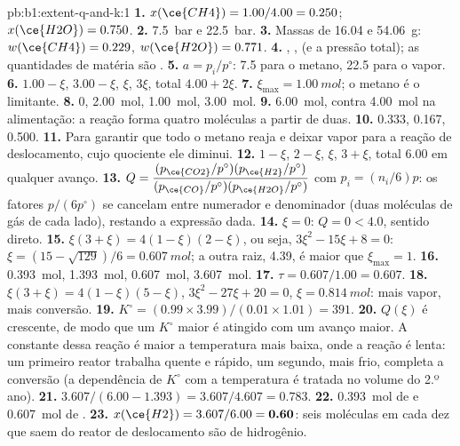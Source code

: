 \begin{solution}{pb:b1:extent-q-and-k:1}
\textbf{1.} $x(\ce{CH4}) = 1.00/4.00 = 0.250$; $x(\ce{H2O}) = 0.750$.
\textbf{2.} \qty{7.5}{bar} e \qty{22.5}{bar}.
\textbf{3.} Massas de 16.04 e \qty{54.06}{g}: $w(\ce{CH4}) = 0.229$,
$w(\ce{H2O}) = 0.771$.
\textbf{4.} , ,  (e a
pressão total); as quantidades de matéria são .
\textbf{5.} $a = p_i/p^\circ$: 7.5 para o metano, 22.5 para o vapor.
\textbf{6.}  $1.00 - \xi$,  $3.00 - \xi$,  $\xi$,
 $3\xi$, total $4.00 + 2\xi$.
\textbf{7.} $\xi_{\max} = \qty{1.00}{mol}$; o metano é o limitante.
\textbf{8.}  0,  \qty{2.00}{mol},  \qty{1.00}{mol},
 \qty{3.00}{mol}.
\textbf{9.} \qty{6.00}{mol}, contra \qty{4.00}{mol} na alimentação: a
reação forma quatro moléculas a partir de duas.
\textbf{10.}  0.333,  0.167,  0.500.
\textbf{11.} Para garantir que todo o metano reaja e deixar vapor para a
reação de deslocamento, cujo quociente ele diminui.
\textbf{12.}  $1 - \xi$,  $2 - \xi$,  $\xi$, 
$3 + \xi$, total 6.00 em qualquer avanço.
\textbf{13.} $Q = \dfrac{(p_{\ce{CO2}}/p^\circ)(p_{\ce{H2}}/p^\circ)}
{(p_{\ce{CO}}/p^\circ)(p_{\ce{H2O}}/p^\circ)}$ com $p_i = (n_i/6)p$: os
fatores $p/(6p^\circ)$ se cancelam entre numerador e denominador (duas
moléculas de gás de cada lado), restando a expressão dada.
\textbf{14.} $\xi = 0$: $Q = 0 < 4.0$, sentido direto.
\textbf{15.} $\xi(3 + \xi) = 4(1 - \xi)(2 - \xi)$, ou seja, $3\xi^2 - 15\xi +
8 = 0$: $\xi = (15 - \sqrt{129})/6 = \qty{0.607}{mol}$; a outra raiz,
4.39, é maior que $\xi_{\max} = 1$.
\textbf{16.}  \qty{0.393}{mol},  \qty{1.393}{mol},
 \qty{0.607}{mol},  \qty{3.607}{mol}.
\textbf{17.} $\tau = 0.607/1.00 = 0.607$.
\textbf{18.} $\xi(3 + \xi) = 4(1 - \xi)(5 - \xi)$, $3\xi^2 - 27\xi + 20 =
0$, $\xi = \qty{0.814}{mol}$: mais vapor, mais conversão.
\textbf{19.} $K^\circ = (0.99 \times 3.99)/(0.01 \times 1.01) = 391$.
\textbf{20.} $Q(\xi)$ é crescente, de modo que um $K^\circ$ maior é
atingido com um avanço maior. A constante dessa reação é maior a
temperatura mais baixa, onde a reação é lenta: um primeiro reator
trabalha quente e rápido, um segundo, mais frio, completa a conversão (a
dependência de $K^\circ$ com a temperatura é tratada no volume do 2.º ano).
\textbf{21.} $3.607/(6.00 - 1.393) = 3.607/4.607 = 0.783$.
\textbf{22.} \qty{0.393}{mol} de  e \qty{0.607}{mol} de .
\textbf{23.} $x(\ce{H2}) = 3.607/6.00 = \textbf{0.60}$: seis moléculas em
cada dez que saem do reator de deslocamento são de hidrogênio.
\end{solution}
